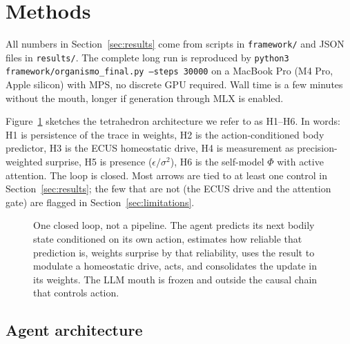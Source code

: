 \documentclass[11pt,a4paper]{article}
\begin{document}
\section{Methods}
\label{sec:methods}

All numbers in Section~\ref{sec:results} come from scripts in \texttt{framework/} and JSON files in \texttt{results/}. The complete long run is reproduced by \texttt{python3 framework/organismo\_final.py --steps 30000} on a MacBook Pro (M4 Pro, Apple silicon) with MPS, no discrete GPU required. Wall time is a few minutes without the mouth, longer if generation through MLX is enabled.

Figure~\ref{fig:tetra} sketches the tetrahedron architecture we refer to as H1--H6. In words: H1 is persistence of the trace in weights, H2 is the action-conditioned body predictor, H3 is the ECUS homeostatic drive, H4 is measurement as precision-weighted surprise, H5 is presence ($\epsilon/\sigma^2$), H6 is the self-model $\Phi$ with active attention. The loop is closed. Most arrows are tied to at least one control in Section~\ref{sec:results}; the few that are not (the ECUS drive and the attention gate) are flagged in Section~\ref{sec:limitations}.

\begin{figure}[h]
\centering
{}
\caption{One closed loop, not a pipeline. The agent predicts its next bodily state conditioned on its own action, estimates how reliable that prediction is, weights surprise by that reliability, uses the result to modulate a homeostatic drive, acts, and consolidates the update in its weights. The LLM mouth is frozen and outside the causal chain that controls action.}
\label{fig:tetra}
\end{figure}

\subsection{Agent architecture}
\end{document}
